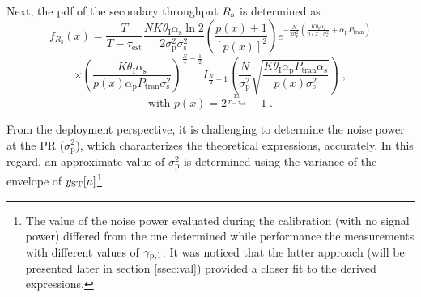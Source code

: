 Next, the pdf of the secondary throughput $R_{\text{s}}$ is determined as
\begin{equation}
	\label{Rspdf}
	f_{R_\textrm{s}}\left(x\right) =
	\frac{T}{T-\tau_\textrm{est}}\frac{N K \theta_\textrm{I} \alpha_\textrm{s} \ln{2}}{2 \sigma_\textrm{p}^2 \sigma_\textrm{s}^2} 
	\left(\frac{p\left(x\right)+1}{\left[p\left(x\right)\right]^2} \right)
	e^{-\frac{N}{2 \sigma_\textrm{p}^2} \left(\frac{K \theta_\textrm{I} \alpha_\textrm{s}}{p\left(x\right)\sigma_\textrm{s}^2} + \alpha_\textrm{p} P_\textrm{tran} \right)}
\end{equation}
\begin{equation*}
	\times \left(\frac{K \theta_\textrm{I} \alpha_\textrm{s}}{p\left(x\right) \alpha_\textrm{p} P_\textrm{tran}\sigma_\textrm{s}^2}\right)^{\frac{N}{4}-\frac{1}{2}}
	I_{\frac{N}{2}-1}\left(\frac{N}{\sigma_\textrm{p}^2}\sqrt{\frac{K \theta_\textrm{I} \alpha_\textrm{p} P_\textrm{tran} \alpha_\textrm{s}}{p\left(x\right) \sigma_\textrm{s}^2}}\right) \;  ,
\end{equation*}
\begin{equation*}
\text{with } p\left(x\right) = 2^\frac{Tx}{T-\tau_\textrm{est}}-1 \;  .
\end{equation*} 



From the deployment perspective, it is challenging to determine the noise power at the PR ($\sigma_\textrm{p}^2$), which characterizes the theoretical expressions, accurately. In this regard, an approximate value of $\sigma_\textrm{p}^2$ is determined using the variance of the envelope of $y_{\text{ST}}[n]$\footnote{The value of the noise power evaluated during the calibration (with no signal power) differed from the one determined while performance the measurements with different values of ${\gamma}_{\text{p,1}}$. It was noticed that the latter approach (will be presented later in section \ref{ssec:val}) provided a closer fit to the derived expressions.}

